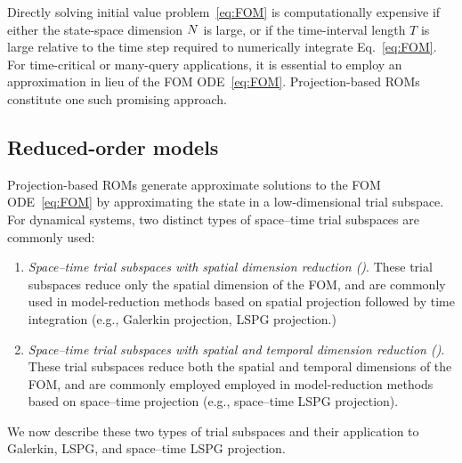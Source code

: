 \documentclass[3p,computermodern,10pt]{elsarticle}
\begin{document}
Directly solving initial value problem~\eqref{eq:FOM} is computationally
	expensive if either the state-space dimension $N$ is large, or if the
	time-interval length $T$ is large relative to the time step required to
	numerically integrate Eq.~\eqref{eq:FOM}. For time-critical or many-query
	applications, it is essential to employ an approximation in lieu of the FOM
	ODE~\eqref{eq:FOM}. Projection-based ROMs constitute one such promising
	approach. 

\subsection{Reduced-order models}
Projection-based ROMs generate approximate solutions to the FOM
	ODE~\eqref{eq:FOM} by approximating the state in a low-dimensional trial
	subspace. For dynamical 
	systems, two distinct types of space--time trial subspaces are commonly used: 
\begin{enumerate} 
	\item \textit{Space–time trial subspaces with spatial dimension reduction (\spatialAcronym)}. These 
	trial subspaces reduce only the spatial dimension of the FOM, and are commonly used
		in model-reduction methods based on spatial projection followed by time
		integration (e.g., Galerkin projection, LSPG projection.)
	\item \textit{Space–time trial subspaces with spatial and temporal dimension reduction (\spaceTimeAcronym)}. These 
	trial subspaces reduce both the spatial and temporal dimensions of the FOM,
		and are commonly employed 
		employed in model-reduction methods based on space--time projection (e.g.,
		space--time LSPG projection).
\end{enumerate}
 We now describe these two types of trial subspaces and their application to 
	Galerkin, LSPG, and space--time LSPG projection. 
\end{document}
